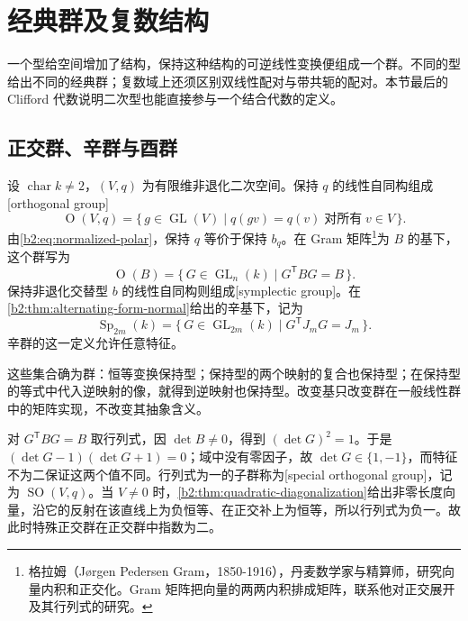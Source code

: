 
\section{经典群及复数结构}
\label{b2:sec:1004}

一个型给空间增加了结构，保持这种结构的可逆线性变换便组成一个群。不同的型给出不同的经典群；复数域上还须区别双线性配对与带共轭的配对。本节最后的 Clifford 代数说明二次型也能直接参与一个结合代数的定义。

%
%
%

\subsection{正交群、辛群与酉群}
\label{b2:subsec:1004:01}

设 \(\operatorname{char}k\ne2\)，\((V,q)\) 为有限维非退化二次空间。保持 \(q\) 的线性自同构组成[orthogonal group]
\[
	\operatorname O(V,q)=\{\,g\in\operatorname{GL}(V)\mid q(gv)=q(v)\;\text{对所有}\;v\in V\,\}.
\]
由\eqref{b2:eq:normalized-polar}，保持 \(q\) 等价于保持 \(b_q\)。在 Gram 矩阵\footnote{格拉姆（Jørgen Pedersen Gram，1850-1916），丹麦数学家与精算师，研究向量内积和正交化。Gram 矩阵把向量的两两内积排成矩阵，联系他对正交展开及其行列式的研究。}为 \(B\) 的基下，这个群写为
\[
	\operatorname O(B)=\{\,G\in\operatorname{GL}_n(k)\mid G^{\mathsf T}BG=B\,\}.
\]
保持非退化交替型 \(b\) 的线性自同构则组成[symplectic group]。在\cref{b2:thm:alternating-form-normal}给出的辛基下，记为
\[
	\operatorname{Sp}_{2m}(k)=\{\,G\in\operatorname{GL}_{2m}(k)\mid G^{\mathsf T}J_mG=J_m\,\}.
\]
辛群的这一定义允许任意特征。

这些集合确为群：恒等变换保持型；保持型的两个映射的复合也保持型；在保持型的等式中代入逆映射的像，就得到逆映射也保持型。改变基只改变群在一般线性群中的矩阵实现，不改变其抽象含义。

\ProseParagraphBreak
对 \(G^{\mathsf T}BG=B\) 取行列式，因 \(\det B\ne0\)，得到 \((\det G)^2=1\)。于是 \((\det G-1)(\det G+1)=0\)；域中没有零因子，故 \(\det G\in\{1,-1\}\)，而特征不为二保证这两个值不同。行列式为一的子群称为[special orthogonal group]，记为 \(\operatorname{SO}(V,q)\)。当 \(V\ne0\) 时，\cref{b2:thm:quadratic-diagonalization}给出非零长度向量，沿它的反射在该直线上为负恒等、在正交补上为恒等，所以行列式为负一。故此时特殊正交群在正交群中指数为二。

